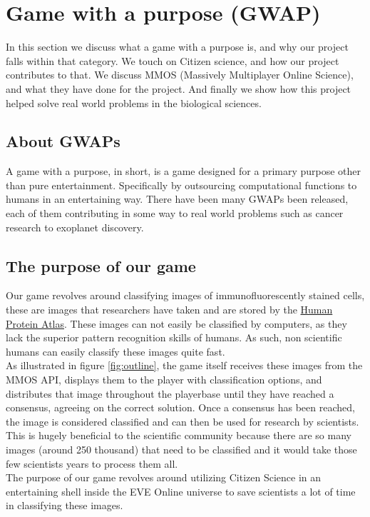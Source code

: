\section{Game with a purpose (GWAP)}\label{sec:gwap}
In this section we discuss what a game with a purpose is, and why our project falls within that category. We touch on Citizen science, and how our project contributes to that. We discuss MMOS (Massively Multiplayer Online Science), and what they have done for the project. And finally we show how this project helped solve real world problems in the biological sciences. \\

\subsection{About GWAPs}
A game with a purpose, in short, is a game designed for a primary purpose other than pure entertainment. Specifically by outsourcing computational functions to humans in an entertaining way. There have been many GWAPs been released, each of them contributing in some way to real world problems such as cancer research to exoplanet discovery. 

\subsection{The purpose of our game}
Our game revolves around classifying images of immunofluorescently stained cells, these are images that researchers have taken and are stored by the \href{http://www.proteinatlas.org/}{Human Protein Atlas}. These images can not easily be classified by computers, as they lack the superior pattern recognition skills of humans. As such, non scientific humans can easily classify these images quite fast.\\ As illustrated in figure \ref{fig:outline}, the game itself receives these images from the MMOS API, displays them to the player with classification options, and distributes that image throughout the playerbase until they have reached a consensus, agreeing on the correct solution. Once a consensus has been reached, the image is considered classified and can then be used for research by scientists.\\ This is hugely beneficial to the scientific community because there are so many images (around 250 thousand) that need to be classified and it would take those few scientists years to process them all. \\The purpose of our game revolves around utilizing Citizen Science in an entertaining shell inside the EVE Online universe to save scientists a lot of time in classifying these images.


